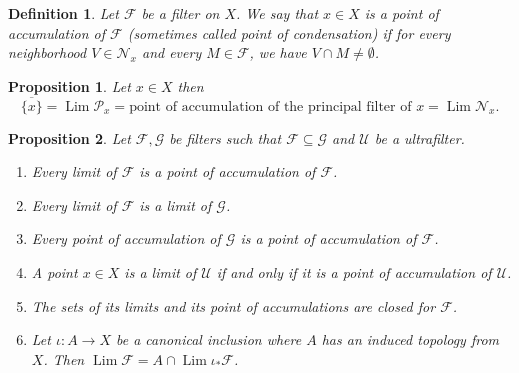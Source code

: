 \documentclass[8pt]{article}
\numberwithin{equation}{section}
\newtheorem{proposition}{Proposition}[subsection]
\newtheorem{definition}{Definition}[subsection]
\DeclareMathOperator{\Lim}{Lim}
\newcommand{\F}[0]{\mathcal{F}}
\newcommand{\U}[0]{\mathcal{U}}
\begin{document}
\begin{definition}
    \label{definition_9}
    Let $\mathcal{F}$ be a filter on $X$. We say that $x\in X$ is a point of accumulation of $\mathcal{F}$ (sometimes called point of condensation) if for every neighborhood $V\in\mathcal{N}_x$ and every $M\in\mathcal{F}$, we have $V\cap M\not=\emptyset$. 
\end{definition}
\begin{proposition}
    Let $x\in X$ then
    \begin{equation*}
        \overline{\{x\}} = \Lim\mathcal{P}_x = \text{point of accumulation of the principal filter of $x$} = \Lim\mathcal{N}_x.
    \end{equation*}
\end{proposition}
\begin{proposition}Let $\F,\mathcal{G}$ be filters such that $\F\subseteq\mathcal{G}$ and $\U$ be a ultrafilter.
    \label{fact_11}
    \label{proposition_2_11}
    \begin{enumerate}[1.]
        \item Every limit of $\F$ is a point of accumulation of $\F$.
        \item Every limit of $\F$ is a limit of $\mathcal{G}$.
        \item Every point of accumulation of $\mathcal{G}$ is a point of accumulation of $\F$.
        \item A point $x\in X$ is a limit of $\U$ if and only if it is a point of accumulation of $\U$.
        \item The sets of its limits and its point of accumulations are closed for $\F$.
        \item Let $\iota:A\to X$ be a canonical inclusion where $A$ has an induced topology from $X$. Then $\Lim\F = A\cap\Lim\iota_*\F$.
    \end{enumerate}
\end{proposition}
\end{document}
